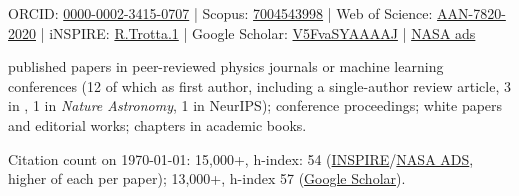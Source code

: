 

\newcommand{\preprint}[1]{\texttt{arxiv:#1}}
\newcommand{\vspazio}{\rule{0pt}{30pt}}

\newcommand{\onestar}{\marginnote{\small 100+}}
\newcommand{\threestars}{\marginnote{\small 500+}}
\newcommand{\fourstars}{\marginnote{\small 1000+}}

\newcommand{\paper}[3]{#1, {`#2'}, #3}
\newcommand{\paperN}[4]{#1, {`#2'}, {#3,} 
\preprint{\href{https://arxiv.org/abs/#4}{#4}}}



\newpage
{\small \noindent  ORCID: \href{https://orcid.org/0000-0002-3415-0707}{0000-0002-3415-0707} | Scopus: \href{http://www.scopus.com/inward/authorDetails.url?authorID=7004543998&partnerID=MN8TOARS}{7004543998}  | Web of Science: \href{https://publons.com/researcher/3628593/roberto-trotta/}{AAN-7820-2020}} | 
iNSPIRE: \href{https://inspirehep.net/literature?sort=mostrecent&size=25&page=1&q=a%20R.Trotta.1&ui-citation-summary=true}{R.Trotta.1}
| Google Scholar: \href{https://scholar.google.com/citations?hl=en&user=V5FvaSYAAAAJ}{V5FvaSYAAAAJ} 
| \href{https://ui.adsabs.harvard.edu/search/q=orcid%3A0000-0002-3415-0707&sort=date%20desc%2C%20bibcode%20desc&p_=0}{NASA ads}


\noindent {} published papers in peer-reviewed physics journals or machine learning conferences (12 of which as first author, including a single-author review article, 3 in \PRL, 1 in {\em Nature Astronomy}, 1 in NeurIPS);  conference proceedings;  white papers and editorial works;  chapters in academic books.

\noindent Citation count on \today: 15,000+, h-index: 54  (\href{https://inspirehep.net/literature?sort=mostrecent&size=25&page=1&q=a%20R.Trotta.1&ui-citation-summary=true}{INSPIRE}/\href{https://ui.adsabs.harvard.edu/search/q=orcid%3A0000-0002-3415-0707&sort=date%20desc%2C%20bibcode%20desc&p_=0}{NASA ADS}, higher of each per paper); 13,000+, h-index 57 (\href{https://scholar.google.com/citations?hl=en&user=V5FvaSYAAAAJ}{Google Scholar}). \\ 

